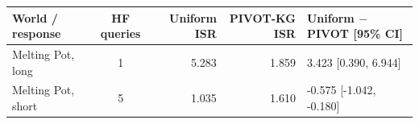 \begin{tabular*}{\linewidth}{@{\extracolsep{\fill}}lcrrl@{}}
\toprule
World / response & HF queries & Uniform ISR & PIVOT-KG ISR & \shortstack[l]{Uniform $-$ PIVOT\\{[95\% CI]}} \\
\midrule
Melting Pot, long & 1 & 5.283 & 1.859 & 3.423 [0.390, 6.944] \\
Melting Pot, short & 5 & 1.035 & 1.610 & -0.575 [-1.042, -0.180] \\
\bottomrule
\end{tabular*}
